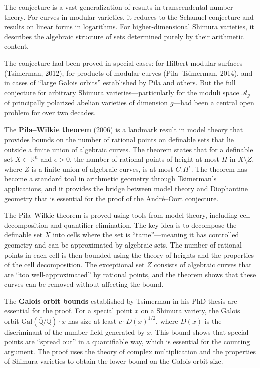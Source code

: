 The conjecture is a vast generalization of results in transcendental number theory. For curves in modular varieties, it reduces to the Schanuel conjecture and results on linear forms in logarithms. For higher-dimensional Shimura varieties, it describes the algebraic structure of sets determined purely by their arithmetic content.

The conjecture had been proved in special cases: for Hilbert modular surfaces (Tsimerman, 2012), for products of modular curves (Pila--Tsimerman, 2014), and in cases of ``large Galois orbits'' established by Pila and others. But the full conjecture for arbitrary Shimura varieties---particularly for the moduli space $\mathcal{A}_g$ of principally polarized abelian varieties of dimension $g$---had been a central open problem for over two decades.

The \textbf{Pila--Wilkie theorem} (2006) is a landmark result in model theory that provides bounds on the number of rational points on definable sets that lie outside a finite union of algebraic curves. The theorem states that for a definable set $X \subset \mathbb{R}^n$ and $\epsilon > 0$, the number of rational points of height at most $H$ in $X \setminus Z$, where $Z$ is a finite union of algebraic curves, is at most $C_\epsilon H^\epsilon$. The theorem has become a standard tool in arithmetic geometry through Tsimerman's applications, and it provides the bridge between model theory and Diophantine geometry that is essential for the proof of the Andr\'{e}--Oort conjecture.

The Pila--Wilkie theorem is proved using tools from model theory, including cell decomposition and quantifier elimination. The key idea is to decompose the definable set $X$ into cells where the set is ``tame''---meaning it has controlled geometry and can be approximated by algebraic sets. The number of rational points in each cell is then bounded using the theory of heights and the properties of the cell decomposition. The exceptional set $Z$ consists of algebraic curves that are ``too well-approximated'' by rational points, and the theorem shows that these curves can be removed without affecting the bound.

The \textbf{Galois orbit bounds} established by Tsimerman in his PhD thesis are essential for the proof. For a special point $x$ on a Shimura variety, the Galois orbit $\mathrm{Gal}(\overline{\mathbb{Q}}/\mathbb{Q}) \cdot x$ has size at least $c \cdot D(x)^{1/2}$, where $D(x)$ is the discriminant of the number field generated by $x$. This bound shows that special points are ``spread out'' in a quantifiable way, which is essential for the counting argument. The proof uses the theory of complex multiplication and the properties of Shimura varieties to obtain the lower bound on the Galois orbit size.

